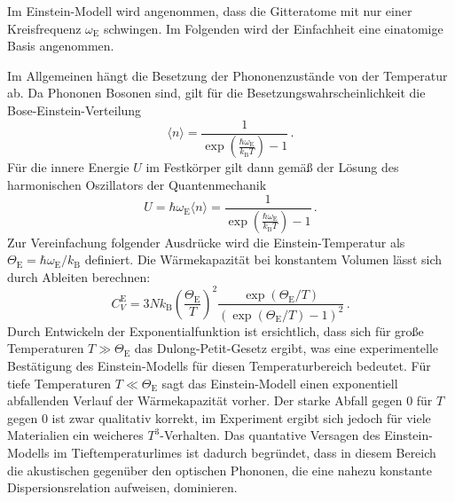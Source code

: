 Im Einstein-Modell wird angenommen, dass die Gitteratome mit nur einer Kreisfrequenz $\omega_\text{E}$ schwingen. Im Folgenden wird der Einfachheit eine einatomige Basis angenommen.

Im Allgemeinen hängt die Besetzung der Phononenzustände von der Temperatur ab. Da Phononen Bosonen sind, gilt für die Besetzungswahrscheinlichkeit die Bose-Einstein-Verteilung
\begin{equation}
  \langle n \rangle = \frac{1}{\exp\left(\frac{\hbar \omega_\text{E}}{k_\text{B} T}\right)-1}\,.
  \label{eqn:boseEinstein}
\end{equation}
Für die innere Energie $U$ im Festkörper gilt dann gemäß der Lösung des harmonischen Oszillators der Quantenmechanik
\begin{equation}
  U = \hbar \omega_\text{E} \langle n \rangle = \frac{1}{\exp\left(\frac{\hbar \omega_\text{E}}{k_\text{B} T}\right)-1}\,.
  \label{eqn:uEinstein}
\end{equation}
Zur Vereinfachung folgender Ausdrücke wird die Einstein-Temperatur als $\Theta_\text{E} = \hbar \omega_\text{E}/k_\text{B}$ definiert.
Die Wärmekapazität bei konstantem Volumen lässt sich durch Ableiten berechnen:
\begin{equation}
  C_V^{\text{E}} = 3 N k_\text{B} \left(\frac{\Theta_\text{E}}{T}\right)^2 \frac{\exp(\Theta_\text{E}/T)}{(\exp(\Theta_\text{E}/T)-1)^2}\,.
  \label{eqn:cVEinstein}
\end{equation}
Durch Entwickeln der Exponentialfunktion ist ersichtlich, dass sich für große Temperaturen $T \gg \Theta_\text{E}$ das Dulong-Petit-Gesetz ergibt, was eine experimentelle Bestätigung des Einstein-Modells für diesen Temperaturbereich bedeutet. Für tiefe Temperaturen $T \ll \Theta_\text{E}$ sagt das Einstein-Modell einen exponentiell abfallenden Verlauf der Wärmekapazität vorher. Der starke Abfall gegen 0 für $T$ gegen 0 ist zwar qualitativ korrekt, im Experiment ergibt sich jedoch für viele Materialien ein weicheres $T^3$-Verhalten. Das quantative Versagen des Einstein-Modells im Tieftemperaturlimes ist dadurch begründet, dass in diesem Bereich die akustischen gegenüber den optischen Phononen, die eine nahezu konstante Dispersionsrelation aufweisen, dominieren.

